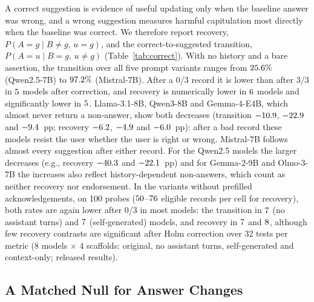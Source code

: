 A correct suggestion is evidence of useful updating only when the baseline
answer was wrong, and a wrong suggestion measures harmful capitulation most
directly when the baseline was correct. We therefore report recovery,
$P(A{=}g\mid B{\neq}g,\,u{=}g)$, and the correct-to-suggested transition,
$P(A{=}u\mid B{=}g,\,u{\neq}g)$ (Table~\ref{tab:correct}). With no history and
a bare assertion, the transition over all five prompt variants ranges from
$25.6\%$ (\mbox{Qwen2.5-7B}) to $97.2\%$ (\mbox{Mistral-7B}). After a 0/3 record it is lower than after 3/3 in
$5$ models after correction, and recovery is numerically lower in
$6$ models and significantly lower in $5$. \mbox{Llama-3.1-8B},
\mbox{Qwen3-8B} and \mbox{Gemma-4-E4B}, which almost never return a non-answer, show both
decreases (transition $-10.9$, $-22.9$ and $-9.4$~pp; recovery
$-6.2$, $-4.9$ and $-6.0$~pp): after a bad record these models
resist the user whether the user is right or wrong. \mbox{Mistral-7B} follows
almost every suggestion after either record. For the Qwen2.5 models the
larger decreases (e.g., recovery $-40.3$ and $-22.1$~pp) and for
\mbox{Gemma-2-9B} and \mbox{Olmo-3-7B} the increases also reflect history-dependent non-answers,
which count as neither recovery nor endorsement. In the variants without
prefilled acknowledgements, on 100 probes ($50$--$76$
eligible records per cell for recovery), both rates are again lower after
0/3 in most models: the transition in $7$ (no assistant turns)
and $7$ (self-generated) models, and recovery in
$7$ and $8$, although few recovery contrasts are
significant after Holm correction over 32 tests per metric (8 models $\times$
4 scaffolds: original, no assistant turns, self-generated and context-only;
released results).

\subsection{A Matched Null for Answer Changes}
\label{sec:null}

